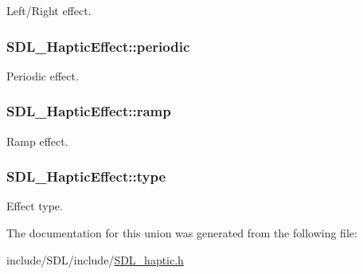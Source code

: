 Left/\-Right effect. \hypertarget{union_s_d_l___haptic_effect_a8320ec4db6ec1dc1d30feb62ee2a2f04}{
\subsubsection[{periodic}]{ S\-D\-L\-\_\-\-Haptic\-Effect\-::periodic}}\label{union_s_d_l___haptic_effect_a8320ec4db6ec1dc1d30feb62ee2a2f04}
Periodic effect. \hypertarget{union_s_d_l___haptic_effect_a1d32ef4c2d1cc89dc938b392f6ad81bd}{
\subsubsection[{ramp}]{ S\-D\-L\-\_\-\-Haptic\-Effect\-::ramp}}\label{union_s_d_l___haptic_effect_a1d32ef4c2d1cc89dc938b392f6ad81bd}
Ramp effect. \hypertarget{union_s_d_l___haptic_effect_a5ff6cfd8da91537091e9a6c2108cb179}{
\subsubsection[{type}]{ S\-D\-L\-\_\-\-Haptic\-Effect\-::type}}\label{union_s_d_l___haptic_effect_a5ff6cfd8da91537091e9a6c2108cb179}
Effect type. 

The documentation for this union was generated from the following file\-:\begin{DoxyCompactItemize}
\item 
include/\-S\-D\-L/include/\hyperlink{_s_d_l__haptic_8h}{S\-D\-L\-\_\-haptic.\-h}\end{DoxyCompactItemize}
